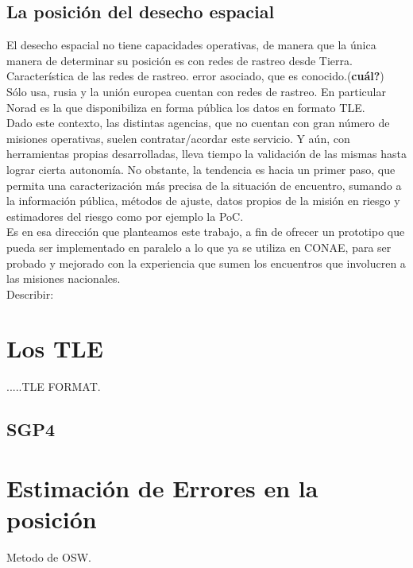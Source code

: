 \subsection*{La posici\'on del desecho espacial}
El desecho espacial no tiene capacidades operativas, de manera que la \'unica manera de determinar su posici\'on es con redes de rastreo desde Tierra.\\
Caracter\'istica de las redes de rastreo. error asociado, que es conocido.({\bf{cu\'al?}})\\
S\'olo usa, rusia y la uni\'on europea cuentan con redes de rastreo. En particular Norad es la que disponibiliza en forma p\'ublica los datos en formato TLE.\\
Dado este contexto, las distintas agencias, que no cuentan con gran n\'umero de misiones operativas, suelen contratar/acordar este servicio. Y a\'un, con herramientas propias desarrolladas, lleva tiempo la validaci\'on de las mismas hasta lograr cierta autonom\'ia. No obstante, la tendencia es hacia un primer paso, que permita una caracterizaci\'on m\'as precisa de la situaci\'on de encuentro, sumando a la informaci\'on p\'ublica, m\'etodos de ajuste, datos propios de la misi\'on en riesgo y estimadores del riesgo como por ejemplo la \ac{PoC}.\\
Es en esa direcci\'on que planteamos este trabajo, a fin de ofrecer un prototipo que pueda ser implementado en paralelo a lo que ya se utiliza en CONAE, para ser probado y mejorado con la experiencia que sumen los encuentros que involucren a las misiones nacionales.\\
Describir:\\

\section{Los TLE}{\label{sec:tleformat}}

.....TLE FORMAT.

\subsection{SGP4}{\label{sec:sgp4model}}

\section{Estimaci\'on de Errores en la posici\'on}
Metodo de OSW.
